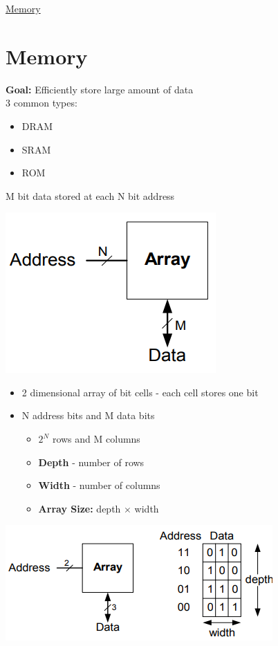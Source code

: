 \documentclass{article}[18pt]
\begin{document}
\begin{center}
\underline{\huge Memory}
\end{center}
\section{Memory}
\textbf{Goal:} Efficiently store large amount of data\\
3 common types:
\begin{itemize}
	\item DRAM
	\item SRAM
	\item ROM
\end{itemize}
M bit data stored at each N bit address
\begin{center}
	\includegraphics[scale=0.7]{memory}
\end{center}
\begin{itemize}
	\item 2 dimensional array of bit cells - each cell stores one bit
	\item N address bits and M data bits
	\begin{itemize}
		\item $2^N$ rows and M columns
		\item \textbf{Depth} - number of rows
		\item \textbf{Width} - number of columns
		\item \textbf{Array Size:} depth $\times$ width
	\end{itemize}
\end{itemize}
\begin{center}
	\includegraphics[scale=0.7]{memory1}
\end{center}
\end{document}
